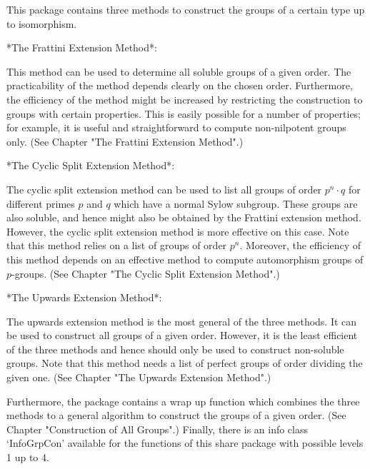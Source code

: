 


This package contains three methods to construct the groups of a
certain type up to isomorphism.


*The Frattini Extension Method*:

This method can be used to determine all soluble groups of a given
order. The practicability of the method depends clearly on the
chosen order. Furthermore, the efficiency of the method might be
increased by restricting the construction to groups with certain
properties. This is easily possible for a number of properties;
for example, it is useful and straightforward to compute non-nilpotent
groups only.
(See Chapter "The Frattini Extension Method".)


*The Cyclic Split Extension Method*:

The cyclic split extension method can be used to list all groups of
order $p^n \cdot q$ for different primes $p$ and $q$ which have a
normal Sylow subgroup. These groups are also soluble, and hence might
also be obtained by the Frattini extension method. However, the cyclic
split extension method is more effective on this case. Note that this
method relies on a list of groups of order $p^n$. Moreover, the
efficiency of this method depends on an effective method to compute
automorphism groups of $p$-groups. (See Chapter "The Cyclic Split Extension
Method".)


*The Upwards Extension Method*:

The upwards extension method is the most general of the three methods.
It can be used to construct all groups of a given order.  However, it
is the least efficient of the three methods and hence should only be
used to construct non-soluble groups. Note that this method needs
a list of perfect groups of order dividing the given one.
(See Chapter "The Upwards Extension Method".)


Furthermore, the package contains a wrap up function which combines
the three methods to a general algorithm to construct the groups of
a given order. (See Chapter "Construction of All Groups".) Finally,
there is an info class `InfoGrpCon' available for the functions of
this share package with possible levels 1 up to 4.





